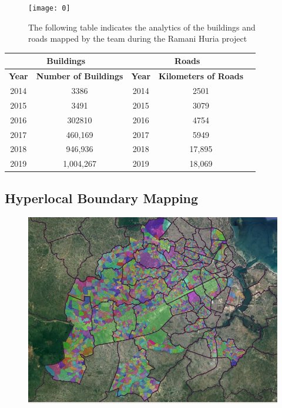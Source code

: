 \documentclass[a4paper,12pt,twoside]{article}
\begin{document}
\begin{figure}[h]
    \centering
    \texttt{[image: 0]}
    \caption{The following table indicates the analytics of the buildings and roads mapped by the team during the Ramani Huria project}
\end{figure}
\begin{center}
\begin{tabular}{|c|c|c|c|c|}
\hline
\multicolumn{2}{|c|}{\bfseries Buildings} & \multicolumn{2}{|c|}{\bfseries Roads}\\
\hline
\bfseries Year & \bfseries Number of Buildings & \bfseries Year & \bfseries Kilometers of Roads\\
\hline
2014 & 3386 & 2014 & 2501\\
\hline
2015 & 3491 & 2015 & 3079\\
\hline
2016 & 302810 & 2016 & 4754\\
\hline
2017 & 460,169 & 2017 & 5949\\
\hline
2018 & 946,936 & 2018 & 17,895\\
\hline
2019 & 1,004,267 & 2019 & 18,069\\
\hline
\end{tabular}
\end{center}


\newpage
\subsection{Hyperlocal Boundary Mapping}
\begin{figure}[h]
    \centering
    \includegraphics[width=.8\textwidth]{images/shinaexample.jpeg}
    \label{fig:my_label}
\end{figure}
\end{document}
